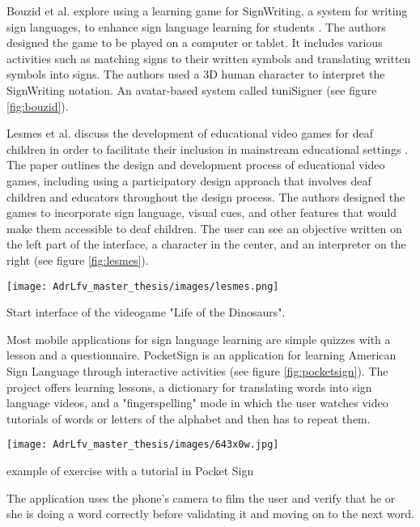Bouzid et al. explore using a learning game for SignWriting, a system for writing sign languages, to enhance sign language learning for students \cite{bouzid2016using}. The authors designed the game to be played on a computer or tablet. It includes various activities such as matching signs to their written symbols and translating written symbols into signs. The authors used a 3D human character to interpret the SignWriting notation. An avatar-based system called tuniSigner \cite{bouzid2013avatar} (see figure \ref{fig:bouzid}).

Lesmes et al. discuss the development of educational video games for deaf children in order to facilitate their inclusion in mainstream educational settings \cite{lesmes2022design}. 
The paper outlines the design and development process of educational video games, including using a participatory design approach that involves deaf children and educators throughout the design process. 
The authors designed the games to incorporate sign language, visual cues, and other features that would make them accessible to deaf children. The user can see an objective written on the left part of the interface, a character in the center, and an interpreter on the right (see figure \ref{fig:lesmes}).

\begin{marginfigure}
    \centering
    \texttt{[image: AdrLfv\_master\_thesis/images/lesmes.png]}
    \caption{Start interface of the videogame "Life of the Dinosaurs".}
    \label{fig:lesmes}
\end{marginfigure}

Most mobile applications for sign language learning are simple quizzes with a lesson and a questionnaire. PocketSign is an application for learning American Sign Language through interactive activities (see figure \ref{fig:pocketsign}). 
The project offers learning lessons, a dictionary for translating words into sign language videos, and a "fingerspelling" mode in which the user watches video tutorials of words or letters of the alphabet and then has to repeat them. 

\begin{marginfigure}
    \centering
    \texttt{[image: AdrLfv\_master\_thesis/images/643x0w.jpg]}
    \caption{example of exercise with a tutorial in Pocket Sign}
    \label{fig:pocketsign}
\end{marginfigure}

The application uses the phone's camera to film the user and verify that he or she is doing a word correctly before validating it and moving on to the next word.

